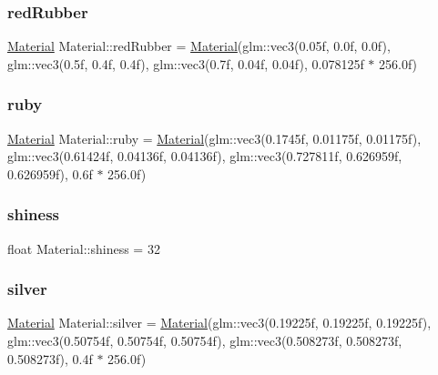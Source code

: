 \mbox{\label{struct_material_a5e1b659445c024a24237731f7d35aa52}} 
\subsubsection{\texorpdfstring{redRubber}{redRubber}}
{\footnotesize\ttfamily \mbox{\hyperlink{struct_material}{Material}} Material\+::red\+Rubber = \mbox{\hyperlink{struct_material}{Material}}(glm\+::vec3(0.\+05f, 0.\+0f, 0.\+0f), glm\+::vec3(0.\+5f, 0.\+4f, 0.\+4f), glm\+::vec3(0.\+7f, 0.\+04f, 0.\+04f), 0.\+078125f $\ast$ 256.\+0f)\hspace{0.3cm}{\ttfamily [static]}}

\mbox{\label{struct_material_ae269e4b2375a840f121a2560a9d2b05b}} 
\subsubsection{\texorpdfstring{ruby}{ruby}}
{\footnotesize\ttfamily \mbox{\hyperlink{struct_material}{Material}} Material\+::ruby = \mbox{\hyperlink{struct_material}{Material}}(glm\+::vec3(0.\+1745f, 0.\+01175f, 0.\+01175f), glm\+::vec3(0.\+61424f, 0.\+04136f, 0.\+04136f), glm\+::vec3(0.\+727811f, 0.\+626959f, 0.\+626959f), 0.\+6f $\ast$ 256.\+0f)\hspace{0.3cm}{\ttfamily [static]}}

\mbox{\label{struct_material_ac40b4d892e9bff09f793d86ca1f3257e}} 
\subsubsection{\texorpdfstring{shiness}{shiness}}
{\footnotesize\ttfamily float Material\+::shiness = 32}

\mbox{\label{struct_material_aef9dfcd5c4f7aaa53ee68831a19f68ca}} 
\subsubsection{\texorpdfstring{silver}{silver}}
{\footnotesize\ttfamily \mbox{\hyperlink{struct_material}{Material}} Material\+::silver = \mbox{\hyperlink{struct_material}{Material}}(glm\+::vec3(0.\+19225f, 0.\+19225f, 0.\+19225f), glm\+::vec3(0.\+50754f, 0.\+50754f, 0.\+50754f), glm\+::vec3(0.\+508273f, 0.\+508273f, 0.\+508273f), 0.\+4f $\ast$ 256.\+0f)\hspace{0.3cm}{\ttfamily [static]}}

